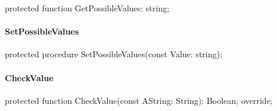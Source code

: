 \documentclass{report}
\newif\ifpdf
\begin{document}
\label{PasDoc_OptionParser.TSetOption-GetPossibleValues}
\begin{list}{}{
\setlength{\itemindent}{0cm}
\setlength{\listparindent}{0cm}
\setlength{\leftmargin}{\evensidemargin}
\addtolength{\leftmargin}{\tmplength}
\settowidth{\labelsep}{X}
\addtolength{\leftmargin}{\labelsep}
\setlength{\labelwidth}{\tmplength}
}
\item[\textbf{Declaration}\hfill]
\ifpdf
\begin{flushleft}
\fi
\begin{ttfamily}
protected function GetPossibleValues: string;\end{ttfamily}

\ifpdf
\end{flushleft}
\fi

\end{list}
\paragraph*{SetPossibleValues}\hspace*{\fill}

\label{PasDoc_OptionParser.TSetOption-SetPossibleValues}
\begin{list}{}{
\setlength{\itemindent}{0cm}
\setlength{\listparindent}{0cm}
\setlength{\leftmargin}{\evensidemargin}
\addtolength{\leftmargin}{\tmplength}
\settowidth{\labelsep}{X}
\addtolength{\leftmargin}{\labelsep}
\setlength{\labelwidth}{\tmplength}
}
\item[\textbf{Declaration}\hfill]
\ifpdf
\begin{flushleft}
\fi
\begin{ttfamily}
protected procedure SetPossibleValues(const Value: string);\end{ttfamily}

\ifpdf
\end{flushleft}
\fi

\end{list}
\paragraph*{CheckValue}\hspace*{\fill}

\label{PasDoc_OptionParser.TSetOption-CheckValue}
\begin{list}{}{
\setlength{\itemindent}{0cm}
\setlength{\listparindent}{0cm}
\setlength{\leftmargin}{\evensidemargin}
\addtolength{\leftmargin}{\tmplength}
\settowidth{\labelsep}{X}
\addtolength{\leftmargin}{\labelsep}
\setlength{\labelwidth}{\tmplength}
}
\item[\textbf{Declaration}\hfill]
\ifpdf
\begin{flushleft}
\fi
\begin{ttfamily}
protected function CheckValue(const AString: String): Boolean; override;\end{ttfamily}

\ifpdf
\end{flushleft}
\fi

\end{list}
\end{document}
